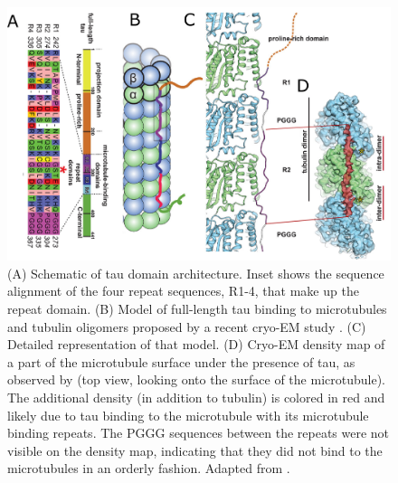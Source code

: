 \begin{figure}[h!tb]
\centering
\includegraphics[scale=0.93]{Figures/tau.png}
\caption[Introduction to tau.]{
(A) Schematic of tau domain architecture. Inset shows the sequence alignment of the four repeat sequences, R1-4, that make up the repeat domain. (B) Model of full-length tau binding to microtubules and tubulin oligomers proposed by a recent cryo-EM study \parencite{Kellogg2018}. (C) Detailed representation of that model. (D) Cryo-EM density map of a part of the microtubule surface under the presence of tau, as observed by \cite{Kellogg2018} (top view, looking onto the surface of the microtubule). The additional density (in addition to tubulin) is colored in red and likely due to tau binding to the microtubule with its microtubule binding repeats. The PGGG sequences between the repeats were not visible on the density map, indicating that they did not bind to the microtubules in an orderly fashion. Adapted from \cite{Kellogg2018}. 
	}\label{tau}
\end{figure}

